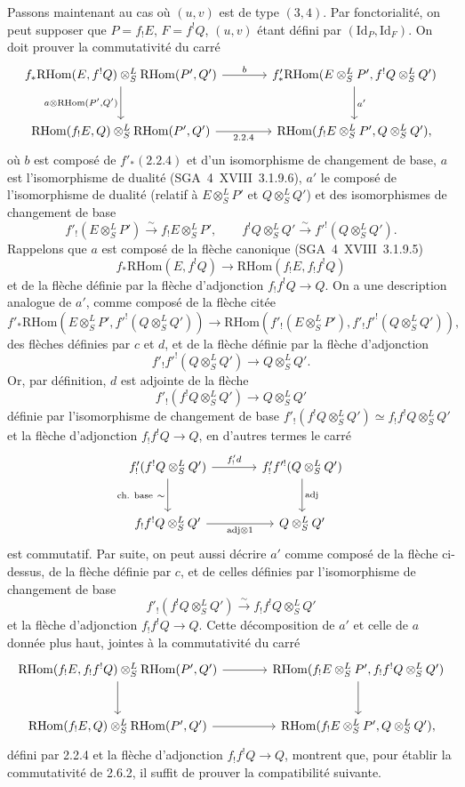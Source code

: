 \documentclass[11pt]{article}
\providecommand{\RHom}{\mathrm{RHom}}
\providecommand{\Id}{\mathrm{Id}}
\providecommand{\RHom}{\mathrm{RHom}}
\providecommand{\RHom}{\mathrm R\mathcal{H}om}
\providecommand{\RHom}{\mathrm{RHom}}
\begin{document}
Passons maintenant au cas où $(u,v)$ est de type $(3,4)$. Par fonctorialité, on peut supposer que $P=f_{!}E$, $F=f^{!}Q$, $(u,v)$ étant défini par $(\Id_P,\Id_F)$. On doit prouver la commutativité du carré
\[
\begin{tikzcd}[column sep=large,row sep=large]
f_*\RHom(E,f^!Q)\otimes^L_S\RHom(P',Q') \arrow[r,"b"] \arrow[d,"{a\otimes\RHom(P',Q')}"'] & f'_*\RHom(E\otimes^L_SP',f^!Q\otimes^L_SQ') \arrow[d,"a'"]\\
\RHom(f_!E,Q)\otimes^L_S\RHom(P',Q') \arrow[r,"2.2.4"'] & \RHom(f_!E\otimes^L_SP',Q\otimes^L_SQ'),
\end{tikzcd}
\]
où $b$ est composé de $f'_*(2.2.4)$ et d'un isomorphisme de changement de base, $a$ est l'isomorphisme de dualité (SGA~4~XVIII~3.1.9.6), $a'$ le composé de l'isomorphisme de dualité (relatif à $E\otimes^L_SP'$ et $Q\otimes^L_SQ'$) et des isomorphismes de changement de base
\[
f'_!(E\otimes^L_SP')\xrightarrow{\sim}f_!E\otimes^L_SP',
\qquad
f^!Q\otimes^L_SQ'\xrightarrow{\sim}f'^!(Q\otimes^L_SQ').
\]
Rappelons que $a$ est composé de la flèche canonique (SGA~4~XVIII~3.1.9.5)
\[
f_*\RHom(E,f^!Q)\longrightarrow\RHom(f_!E,f_!f^!Q)
\]
et de la flèche définie par la flèche d'adjonction $f_!f^!Q\to Q$. On a une description analogue de $a'$, comme composé de la flèche citée
\[
f'_*\RHom(E\otimes^L_SP',f'^!(Q\otimes^L_SQ'))\longrightarrow
\RHom(f'_!(E\otimes^L_SP'),f'_!f'^!(Q\otimes^L_SQ')),
\]
des flèches définies par $c$ et $d$, et de la flèche définie par la flèche d'adjonction
\[
f'_!f'^!(Q\otimes^L_SQ')\longrightarrow Q\otimes^L_SQ'.
\]
Or, par définition, $d$ est adjointe de la flèche
\[
f'_!(f^!Q\otimes^L_SQ')\longrightarrow Q\otimes^L_SQ'
\]
définie par l'isomorphisme de changement de base $f'_!(f^!Q\otimes^L_SQ')\simeq f_!f^!Q\otimes^L_SQ'$ et la flèche d'adjonction $f_!f^!Q\to Q$, en d'autres termes le carré
\[
\begin{tikzcd}[column sep=large,row sep=large]
f'_!(f^!Q\otimes^L_SQ') \arrow[r,"{f'_!d}"] \arrow[d,"{\text{ch. base}\ \sim}"'] & f'_!f'^!(Q\otimes^L_SQ') \arrow[d,"\mathrm{adj}"]\\
f_!f^!Q\otimes^L_SQ' \arrow[r,"{\mathrm{adj}\otimes 1}"'] & Q\otimes^L_SQ'
\end{tikzcd}
\]
est commutatif. Par suite, on peut aussi décrire $a'$ comme composé de la flèche ci-dessus, de la flèche définie par $c$, et de celles définies par l'isomorphisme de changement de base
\[
f'_!(f^!Q\otimes^L_SQ')\xrightarrow{\sim}f_!f^!Q\otimes^L_SQ'
\]
et la flèche d'adjonction $f_!f^!Q\to Q$. Cette décomposition de $a'$ et celle de $a$ donnée plus haut, jointes à la commutativité du carré
\[
\begin{tikzcd}[column sep=large,row sep=large]
\RHom(f_!E,f_!f^!Q)\otimes^L_S\RHom(P',Q') \arrow[r] \arrow[d] & \RHom(f_!E\otimes^L_SP',f_!f^!Q\otimes^L_SQ') \arrow[d]\\
\RHom(f_!E,Q)\otimes^L_S\RHom(P',Q') \arrow[r] & \RHom(f_!E\otimes^L_SP',Q\otimes^L_SQ'),
\end{tikzcd}
\]
défini par 2.2.4 et la flèche d'adjonction $f_!f^!Q\to Q$, montrent que, pour établir la commutativité de 2.6.2, il suffit de prouver la compatibilité suivante.
\end{document}
